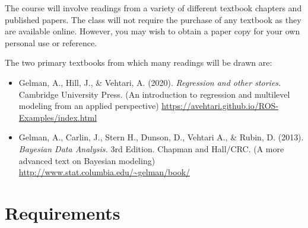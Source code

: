 \documentclass[11pt, article, oneside]{memoir}
\theoremstyle{Assumption}
\begin{document}
The course will involve readings from a variety of different textbook chapters and published papers. The class will not require the purchase of any textbook as they are available online. However, you may wish to obtain a paper copy for your own personal use or reference.

The two primary textbooks from which many readings will be drawn are:

\begin{itemize}
\item Gelman, A., Hill, J., \& Vehtari, A. (2020). \textit{Regression and other stories.} Cambridge University Press. (An introduction to regression and multilevel modeling from an applied perspective) \url{https://avehtari.github.io/ROS-Examples/index.html}
\item Gelman, A., Carlin, J., Stern H., Dunson, D., Vehtari A., \& Rubin, D. (2013). \textit{Bayesian Data Analysis.} 3rd Edition. Chapman and Hall/CRC. (A more advanced text on Bayesian modeling) \url{http://www.stat.columbia.edu/~gelman/book/}
\end{itemize}


\section*{Requirements}
\end{document}
